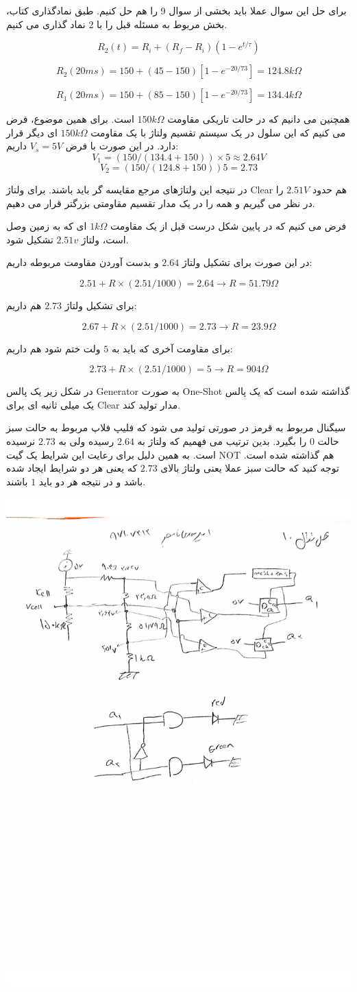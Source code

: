 \documentclass[12pt]{article}
\begin{document}
برای حل این سوال عملا باید بخشی از سوال 9 را هم حل کنیم. طبق نمادگذاری کتاب، بخش مربوط به مسئله قبل را با 2 نماد گذاری می کنیم.

$$R_{2}(t) = R_i + (R_f - R_i)(1 - e^{t/\tau})$$

$$R_2(20ms) = 150 +(45-150)[1-e^{-20/73}] = 124.8k\Omega$$

$$R_1(20ms) = 150 +(85-150)[1-e^{-20/73}] = 134.4 k\Omega$$

همچنین می دانیم که در حالت تاریکی مقاومت $150k\Omega$ است. برای همین موضوع، فرض می کنیم که این سلول در یک سیستم تقسیم ولتاژ با یک مقاومت $150k\Omega$ ای دیگر قرار دارد. در این صورت با فرض $V_s = 5V$ داریم:
$$V_1 =(150 / (134.4 + 150))\times 5 \approx 2.64 V$$
$$V_2 = (150/(124.8+150))5 = 2.73$$

در نتیجه این ولتاژهای مرجع مقایسه گر باید باشند. برای ولتاژ Clear هم حدود $2.51V$ را در نظر می گیریم و همه را در یک مدار تقسیم مقاومتی بزرگتر قرار می دهیم.

فرض می کنیم که در پایین شکل درست قبل از یک مقاومت $1k\Omega$ ای که به زمین وصل است، ولتاژ $2.51v$ تشکیل شود.

در این صورت برای تشکیل ولتاژ $2.64$ و بدست آوردن مقاومت مربوطه داریم:

$$2.51 + R \times (2.51/1000) = 2.64 \rightarrow R=51.79 \Omega$$

برای تشکیل ولتاژ $2.73$ هم داریم:

$$2.67 + R \times(2.51/1000) =2.73 \rightarrow R= 23.9 \Omega$$

برای مقاومت آخری که باید به $5$ ولت ختم شود هم داریم:

$$2.73 + R \times (2.51/1000) = 5 \rightarrow R = 904 \Omega$$

در شکل زیر یک پالس Generator به صورت One-Shot گذاشته شده است که یک پالس یک میلی ثانیه ای برای Clear مدار تولید کند.

سیگنال مربوط به قرمز در صورتی تولید می شود که فلیپ فلاپ مربوط به حالت سبز حالت $0$ را بگیرد. بدین ترتیب می فهمیم که ولتاژ به $2.64$ رسیده ولی به $2.73$ نرسیده است. به همین دلیل برای رعایت این شرایط یک گیت NOT هم گذاشته شده است. توجه کنید که حالت سبز عملا یعنی ولتاژ بالای $2.73$ که یعنی هر دو شرایط ایجاد شده باشد و در نتیجه هر دو باید $1$ باشند.


\begin{center}
	\includegraphics[width = 0.5 \textwidth]{images/10.pdf}
\end{center}
\newpage
\end{document}

